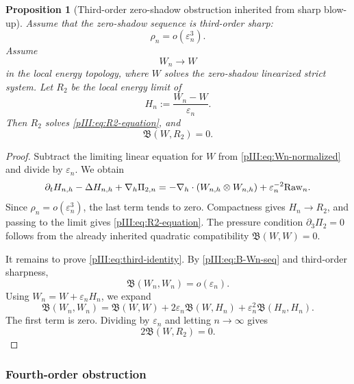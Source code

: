 \documentclass[11pt]{article}
\numberwithin{equation}{section}
\theoremstyle{plain}
\newtheorem{proposition}{Proposition}[section]
\theoremstyle{definition}
\theoremstyle{remark}
\newcommand{\eps}{\varepsilon}
\newcommand{\nabh}{\nabla_h}
\newcommand{\calB}{\mathfrak B}
\begin{document}
\begin{proposition}[Third-order zero-shadow obstruction inherited from sharp blow-up]
\label{pIII:prop:third-order-zero-shadow}
Assume that the zero-shadow sequence is third-order sharp:
\[
        \rho_n=o(\eps_n^3).
\]
Assume
\[
        W_n\to W
\]
in the local energy topology, where \(W\) solves the zero-shadow linearized strict system.
Let \(R_2\) be the local energy limit of
\begin{equation}\label{pIII:eq:Hn-def}
        H_n:=\frac{W_n-W}{\eps_n}.
\end{equation}
Then \(R_2\) solves \eqref{pIII:eq:R2-equation}, and
\begin{equation}\label{pIII:eq:third-identity}
        \calB(W,R_2)=0.
\end{equation}
\end{proposition}

\begin{proof}
Subtract the limiting linear equation for \(W\) from \eqref{pIII:eq:Wn-normalized} and divide
by \(\eps_n\).  We obtain
\[
        \partial_tH_{n,h}-\Delta H_{n,h}+\nabh\Pi_{2,n}
        =
        -\nabh\cdot(W_{n,h}\otimes W_{n,h})
        +\eps_n^{-2}{\rm Raw}_n.
\]
Since \(\rho_n=o(\eps_n^3)\), the last term tends to zero.  Compactness gives
\(H_n\to R_2\), and passing to the limit gives \eqref{pIII:eq:R2-equation}.  The pressure
condition \(\partial_3\Pi_2=0\) follows from the already inherited quadratic compatibility
\(\calB(W,W)=0\).

It remains to prove \eqref{pIII:eq:third-identity}.  By \eqref{pIII:eq:B-Wn-seq} and third-order
sharpness,
\[
        \calB(W_n,W_n)=o(\eps_n).
\]
Using \(W_n=W+\eps_nH_n\), we expand
\[
        \calB(W_n,W_n)
        =
        \calB(W,W)+2\eps_n\calB(W,H_n)+
        \eps_n^2\calB(H_n,H_n).
\]
The first term is zero.  Dividing by \(\eps_n\) and letting \(n\to\infty\) gives
\[
        2\calB(W,R_2)=0.
\]
\end{proof}

\subsubsection{Fourth-order obstruction}
\end{document}
